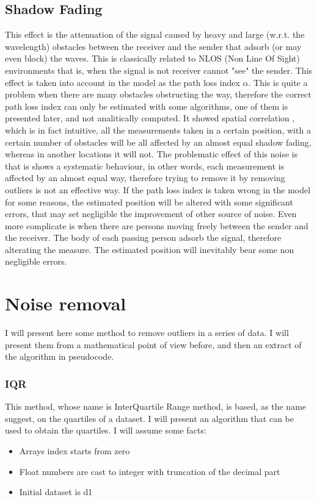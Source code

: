 \documentclass[12pt,twoside]{report}
\begin{document}
\section{Shadow Fading}
This effect is the attenuation of the signal caused by heavy and large (w.r.t. the wavelength) obstacles between the receiver and the sender that adsorb (or may even block) the waves. This is classically related to NLOS (Non Line Of Sight) environments that is, when the signal is not receiver cannot "see" the sender. This effect is taken into account in the model as the path loss index $\alpha$. This is quite a problem when there are many obstacles obstructing the way, therefore the correct path loss index can only be estimated with some algorithms, one of them is presented later, and not analitically computed. It showed spatial correlation \cite{244122,732812}, which is in fact intuitive, all the measurements taken in a certain position, with a certain number of obstacles will be all affected by an almost equal shadow fading, whereas in another locations it will not. The problematic effect of this noise is that is shows a systematic behaviour, in other words, each measurement is affected by an almost equal way, therefore trying to remove it by removing outliers is not an effective way. If the path loss index is taken wrong in the model for some reasons, the estimated position will be altered with some significant errors, that may set negligible the improvement of other source of noise. Even more complicate is when there are persons moving freely between the sender and the receiver. The body of each passing person adsorb the signal, therefore alterating the measure. The estimated position will inevitably bear some non negligible errors.

\chapter{Noise removal}
I will present here some method to remove outliers in a series of data. I will present them from a mathematical point of view before, and then an extract of the algorithm in pseudocode.
\subsection{IQR}
This method, whose name is InterQuartile Range method, is based, as the name suggest, on the quartiles of a dataset. I will present an algorithm that can be used to obtain the quartiles. I will assume some facts:
\begin{itemize}
    \item Arrays index starts from zero
    \item Float numbers are cast to integer with truncation of the decimal part
    \item Initial dataset is d1
\end{itemize}
\end{document}
